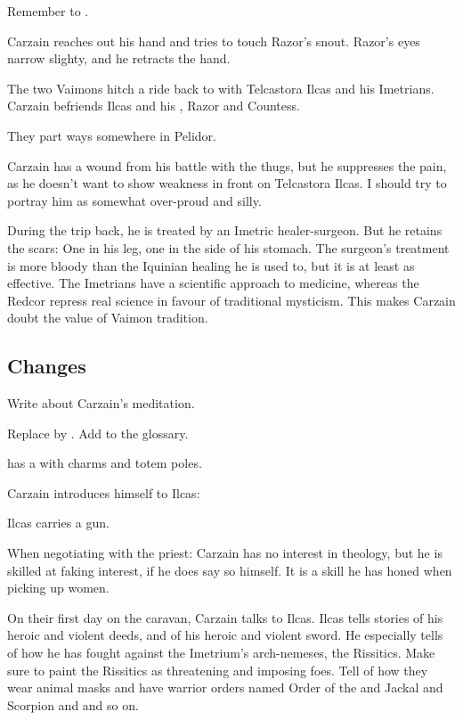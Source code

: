 Remember to .

Carzain reaches out his hand and tries to touch Razor's snout. Razor's eyes narrow slighty, and he retracts the hand. 

The two Vaimons hitch a ride back to \Redglen with Telcastora Ilcas and his Imetrians. Carzain befriends Ilcas and his \nycans, Razor and Countess. 

They part ways somewhere in Pelidor. 

Carzain has a wound from his battle with the thugs, but he suppresses the pain, as he doesn't want to show weakness in front on Telcastora Ilcas. I should try to portray him as somewhat over-proud and silly. 

During the trip back, he is treated by an Imetric healer-surgeon. But he retains the scars: One in his leg, one in the side of his stomach. 
The surgeon's treatment is more bloody than the Iquinian healing he is used to, but it is at least as effective. The Imetrians have a scientific approach to medicine, whereas the Redcor repress real science in favour of traditional mysticism. 
This makes Carzain doubt the value of Vaimon tradition.









\subsection{Changes}
Write about Carzain's meditation. 

Replace  by \quo{\shechinah}.
Add \quo{\shechinah} to the glossary. 

\Bryndwin has a  with charms and totem poles. 

Carzain introduces himself to Ilcas: 

Ilcas carries a gun. 

When negotiating with the priest: 
Carzain has no interest in theology, but he is skilled at faking interest, if he does say so himself. 
It is a skill he has honed when picking up women. 

On their first day on the caravan, Carzain talks to Ilcas. 
Ilcas tells stories of his heroic and violent deeds, and of his heroic and violent sword. 
He especially tells of how he has fought against the Imetrium's arch-nemeses, the Rissitics. 
Make sure to paint the Rissitics as threatening and imposing foes.
Tell of how they wear animal masks and have warrior orders named Order of the  and Jackal and Scorpion and  and so on. 

